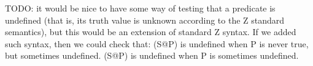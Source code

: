 \documentclass{article}
\begin{document}
TODO: it would be nice to have some way of testing that a predicate is 
      undefined (that is, its truth value is unknown according to the Z 
      standard semantics), but this would be an extension of standard Z syntax.
      If we added such syntax, then we could check that:
      (\exists S@P) is undefined when P is never true, but sometimes undefined.
      (\forall S@P) is undefined when P is sometimes undefined.
\end{document}
